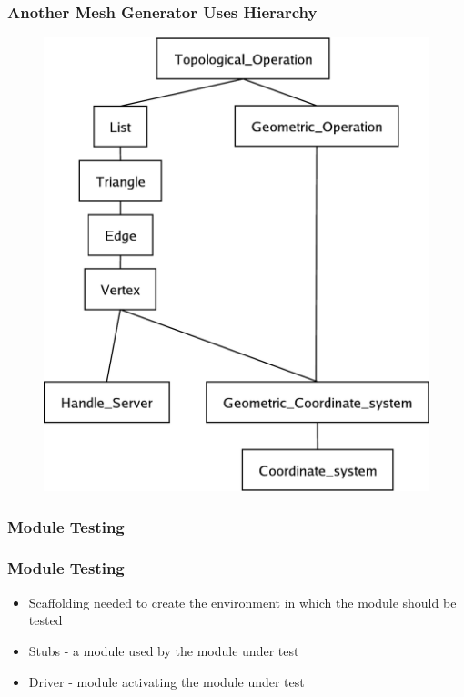 \documentclass[t,12pt,numbers,fleqn]{beamer}
\begin{document}

\begin{frame}
\frametitle{Another Mesh Generator Uses Hierarchy \cite{ElSheikhEtAl2004}}
\begin{figure}[H]
\includegraphics[scale=0.345]{../Figures/hierarchy_diagram.pdf}
\end{figure}
\end{frame}


\begin{frame}
\frametitle{Module Testing}


\end{frame}


\begin{frame}
\frametitle{Module Testing \cite{GhezziEtAl2003}}

\begin{itemize}

\item Scaffolding needed to create the environment in which the module should be
  tested
\item Stubs - a module used by the module under test
\item Driver - module activating the module under test
\end{itemize}

\end{frame}
\end{document}
